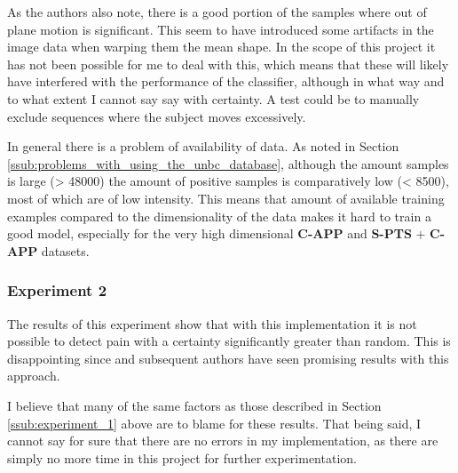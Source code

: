 \documentclass[Main]{subfiles}
\begin{document}
			As the authors also note, there is a good portion of the samples where out of plane motion is significant.
			This seem to have introduced some artifacts in the image data when warping them the mean shape.
			In the scope of this project it has not been possible for me to deal with this, which means that these will likely have interfered with the performance of the classifier, although in what way and to what extent I cannot say say with certainty.
			A test could be to manually exclude sequences where the subject moves excessively.

			In general there is a problem of availability of data.
			As noted in Section \ref{ssub:problems_with_using_the_unbc_database}, although the amount samples is large (> 48000) the amount of positive samples is comparatively low (< 8500), most of which are of low intensity.
			This means that amount of available training examples compared to the dimensionality of the data makes it hard to train a good model, especially for the very high dimensional \textbf{C-APP} and \textbf{S-PTS} + \textbf{C-APP} datasets.
			
		
		\subsubsection{Experiment 2} %
			\label{ssub:experiment_2}
			The results of this experiment show that with this implementation it is not possible to detect pain with a certainty significantly greater than random.
			This is disappointing since \cite{Lucey2011} and subsequent authors have seen promising results with this approach.

			I believe that many of the same factors as those described in Section \ref{ssub:experiment_1} above are to blame for these results.
			That being said, I cannot say for sure that there are no errors in my implementation, as there are simply no more time in this project for further experimentation.			



\end{document}
